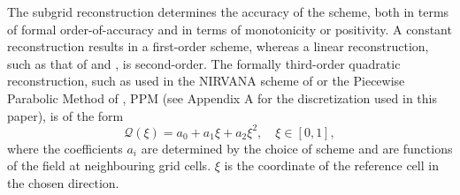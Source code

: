 \documentclass{ametsocV6.1}
\begin{document}
The subgrid reconstruction determines the accuracy of the scheme, both in terms of formal order-of-accuracy and in terms of monotonicity or positivity. A constant reconstruction results in a first-order scheme, whereas a linear reconstruction, such as that of \citet{fromm1968method} and \citet{van1974towards}, is second-order. The formally third-order quadratic reconstruction, such as used in the NIRVANA scheme of \citet{leonard1995nirvana} or the Piecewise Parabolic Method of \citet{colella1984ppm}, PPM (see Appendix A for the discretization used in this paper),  is of the form
\begin{equation} \label{eqn:quad_coef}
    \mathcal{Q}(\xi) = a_0 + a_1 \xi + a_2 \xi^2, \quad \xi \in [0, 1],
\end{equation}
where the coefficients $a_i$ are determined by the choice of scheme and are functions of the field at neighbouring grid cells. $\xi$ is the coordinate of the reference cell in the chosen direction. 
\end{document}
